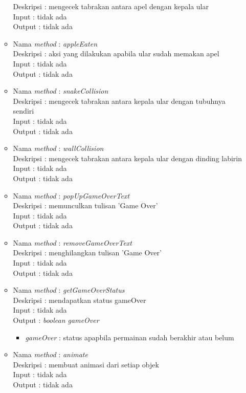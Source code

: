 \begin{enumerate}
\begin{itemize}
				  Deskripsi : mengecek tabrakan antara apel dengan kepala ular\\
				  Input : tidak ada\\
				  Output : tidak ada\\
			\item Nama \textit{method} : \textit{appleEaten}\\
				  Deskripsi : aksi yang dilakukan apabila ular sudah memakan apel\\
				  Input : tidak ada\\
				  Output : tidak ada\\
			\item Nama \textit{method} : \textit{snakeCollision}\\
				  Deskripsi : mengecek tabrakan antara kepala ular dengan tubuhnya sendiri\\
				  Input : tidak ada\\
				  Output : tidak ada\\
			\item Nama \textit{method} : \textit{wallCollision}\\
				  Deskripsi : mengecek tabrakan antara kepala ular dengan dinding labirin\\
				  Input : tidak ada\\
				  Output : tidak ada\\
			\item Nama \textit{method} : \textit{popUpGameOverText}\\
				  Deskripsi : memunculkan tulisan 'Game Over'\\
				  Input : tidak ada\\
				  Output : tidak ada\\
			\item Nama \textit{method} : \textit{removeGameOverText}\\
				  Deskripsi : menghilangkan tulisan 'Game Over'\\
				  Input : tidak ada\\
				  Output : tidak ada\\
			\item Nama \textit{method} : \textit{getGameOverStatus}\\
				  Deskripsi : mendapatkan status gameOver\\
				  Input : tidak ada\\
				  Output : \textit{boolean gameOver}
				  	\begin{itemize}
				  		\item \textit{gameOver} : status apapbila permainan sudah berakhir atau belum
				  	\end{itemize}
			\item Nama \textit{method} : \textit{animate}\\
				  Deskripsi : membuat animasi dari setiap objek\\
				  Input : tidak ada\\
				  Output : tidak ada
		\end{itemize}
		

\end{enumerate}
